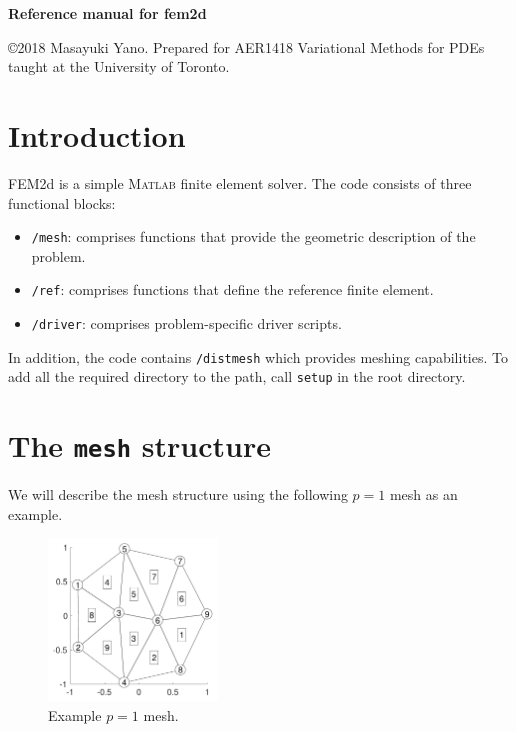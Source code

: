\documentclass[openany,preprint,11pt]{article}
\newcommand{\disclaimer}{\copyright2018 Masayuki Yano.  Prepared for AER1418 Variational Methods for PDEs taught at the University of Toronto.}
\begin{document}
\begin{center}
  \begin{LARGE}
    \textbf{Reference manual for fem2d}
  \end{LARGE}
\end{center}

\noindent\disclaimer
\section{Introduction}
FEM2d is a simple \textsc{Matlab} finite element solver.  The code consists of three functional blocks:
\begin{itemize}
\item \texttt{/mesh}: comprises functions that provide the geometric description of the problem. 
\item \texttt{/ref}: comprises functions that define the reference finite element.
\item \texttt{/driver}: comprises problem-specific driver scripts.
\end{itemize}
In addition, the code contains \texttt{/distmesh} which provides meshing capabilities.  To add all the required directory to the path, call \texttt{setup} in the root directory.


\section{The \texttt{mesh} structure}
We will describe the mesh structure using the following $p=1$ mesh as an example.
\begin{figure}[!h]
  \centering
  \includegraphics[width=0.4\textwidth]{mesh_p1}
  \caption{Example $p=1$ mesh.}
\end{figure}
\end{document}
